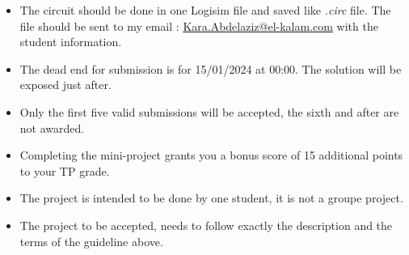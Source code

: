 \documentclass[a4paper, french, 12pt]{article}
\begin{document}
\begin{itemize}

    \item The circuit should be done in one Logisim file and saved like \emph{.circ} file. The file should be sent to my email : \underline{Kara.Abdelaziz@el-kalam.com} with the student information.
    \item The dead end for submission is for 15/01/2024 at 00:00. The solution will be exposed just after.
    \item Only the first five valid submissions will be accepted, the sixth and after are not awarded.
    \item Completing the mini-project grants you a bonus score of 15 additional points to your TP grade.
    \item The project is intended to be done by one student, it is not a groupe project.
    \item The project to be accepted, needs to follow exactly the description and the terms of the guideline above.
    
\end{itemize}

\hspace*{\fill} 
\end{document}
